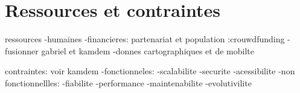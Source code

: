 \section{Ressources et contraintes}

ressources
-humaines
-financieres:
partenariat et population :crouwdfunding
-fusionner gabriel et kamdem
-donnes cartographiques et de mobilte

contraintes: voir kamdem
-fonctionneles:
	-scalabilite
	-securite
	-acessibilite
-non fonctionnellles:
	-fiabilite
	-performance
	-maintenabilite
-evolutivilite
